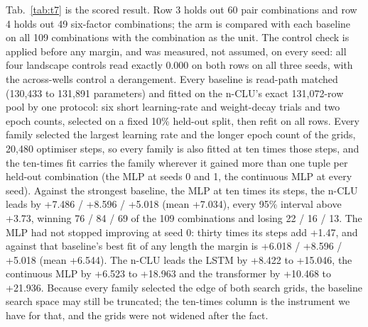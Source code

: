 \documentclass{article} %
\begin{document}
Tab.~\ref{tab:t7} is the scored result. Row 3 holds out 60 pair combinations and row 4 holds out
49 six-factor combinations; the arm is compared with each baseline on all 109 combinations with the combination
as the unit. %
The control check is applied before any margin, and was measured, not assumed, on every seed:
all four landscape controls read exactly 0.000 on both rows on all three seeds, with the
across-wells control a derangement. %
Every baseline is read-path matched (130,433 to 131,891 parameters) and fitted on the n-CLU's exact
131,072-row pool by one protocol: six short learning-rate and weight-decay trials and two epoch
counts, selected on a fixed 10\% held-out split, then refit on all rows. Every family selected the
largest learning rate and the longer epoch count of the grids, 20,480 optimiser steps, so every
family is also fitted at ten times those steps, and the ten-times fit carries the family wherever
it gained more than one tuple per held-out combination (the MLP at seeds 0 and 1, the continuous MLP at every
seed). Against the strongest baseline, the MLP at ten times its steps, the n-CLU leads by +7.486 /
+8.596 / +5.018 (mean +7.034), every 95\% interval above +3.73, winning 76 / 84 / 69 of the 109
combinations and losing 22 / 16 / 13. The MLP had not stopped improving at seed 0: thirty times its steps
add +1.47, and against that baseline's best fit of any length the margin is +6.018 / +8.596 / +5.018
(mean +6.544). The n-CLU leads the LSTM by +8.422 to +15.046, the continuous MLP by +6.523 to +18.963
and the transformer by +10.468 to +21.936. Because every family selected the edge of both search
grids, the baseline search space may still be truncated; the ten-times column is the instrument we
have for that, and the grids were not widened after the fact.
\end{document}
